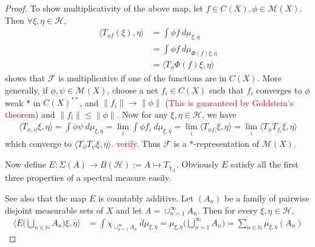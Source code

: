 \begin{proof}
  To show multiplicativity of the above map, let $f \in C(X), \phi
  \in \mathcal{M}(X)$. Then $\forall \xi, \eta \in
  \mathcal{H}$,
  \begin{align*}
    \langle T_{\phi f}(\xi), \eta \rangle  &= \int \phi f \ d \mu_{\xi, \eta} \\
    &= \int \phi f \ d \mu_{\Phi(f) \xi, \eta} \\
    &= \langle T_\phi \Phi(f) \xi ,  \eta \rangle
  \end{align*}
  shows that $\mathscr{F}$ is multiplicative if one of the functions
  are in $C(X)$.
  More generally, if $\phi, \psi \in \mathcal{M}(X)$, choose a net
  $f_i \in C(X)$  such that $f_i$ converges to $\phi$ weak * in
  $C(X)^{**}$, and $\|f_i\| \to \|\phi\|$ (\textcolor{red}{This is
      guaranteed by Goldstein's
  theorem}) and $\|f_i\| \le \|\phi\|$. Now for any $\xi, \eta \in
  \mathcal{H}$, we have
  \begin{align*}
    \langle T_{\phi, \psi} \xi ,  \eta \rangle = \int \phi \psi \ d
    \mu_{\xi, \eta} = \lim_{i} \int \phi f_i \ d \mu_{\xi, \eta} =
    \lim_i \langle T_{\phi f_i} \xi ,  \eta \rangle = \lim_i \langle
    T_\phi T_{f_i} \xi , \eta \rangle
  \end{align*}
  which converge to $\langle T_\phi T_\psi \xi ,  \eta \rangle$.
  \textcolor{red}{verify}. Thus $\mathscr{F}$ is a $*$-representation
  of $\mathcal{M}(X)$.

  Now define $E : \Sigma(A) \to  B(\mathcal{H}) :=   A \mapsto
  T_{\chi_A}$. Obviously $E$ satisfy all the first three properties
  of a spectral measure easily.

  See also that the map $E$ is countably additive. Let $(A_n)$ be a
  family of pairwise disjoint measurable sets of $X$
  and let $A = \cup_{n = 1}^{\infty}A_n$. Then for every $\xi, \eta
  \in \mathcal{H}$,
  \begin{align*}
    \Big \langle E \big(\bigcup_{n \in \mathbb{N}} A_n \big) \xi ,
    \eta \Big \rangle &= \int  \chi_{\cup_{n = 1}^{\infty}A_n} \ d
    \mu_{ \xi, \eta} = \mu_{\xi, \eta}\Big( \bigcup_{n =
    1}^{\infty}A_n \Big) = \sum_{n \in \mathbb{N}} \mu_{\xi , \eta}(A_n)
  \end{align*}

\end{proof}
